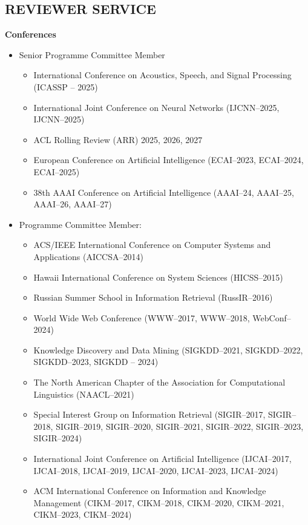 \documentclass[margin]{res}
\begin{document}
\begin{resume}
\section{REVIEWER SERVICE}
\textbf{Conferences}
\begin{itemize} \itemsep -10pt
    \item Senior Programme Committee Member
    \begin{itemize}
        \item International Conference on Acoustics, Speech, and Signal Processing (ICASSP -- 2025)
        \item International Joint Conference on Neural Networks (IJCNN--2025, IJCNN--2025)
        \item ACL Rolling Review (ARR) 2025, 2026, 2027
        \item European Conference on Artificial Intelligence (ECAI--2023, ECAI--2024, ECAI--2025)
        \item 38th AAAI Conference on Artificial Intelligence (AAAI--24, AAAI--25, AAAI--26, AAAI--27)
    \end{itemize}
\end{itemize}
\begin{itemize} \itemsep -10pt
\item Programme Committee Member:
\begin{itemize}
\item ACS/IEEE International Conference on Computer Systems and Applications (AICCSA--2014)
\item Hawaii International Conference on System Sciences (HICSS--2015)
\item Russian Summer School in Information Retrieval (RussIR--2016)
\item World Wide Web Conference (WWW--2017, WWW--2018, WebConf--2024)
\item Knowledge Discovery and Data Mining (SIGKDD--2021, SIGKDD--2022, SIGKDD--2023, SIGKDD -- 2024)
\item The North American Chapter of the Association for Computational Linguistics (NAACL--2021)
\item Special Interest Group on Information Retrieval (SIGIR--2017, SIGIR--2018, SIGIR--2019, SIGIR--2020, SIGIR--2021, SIGIR--2022, SIGIR--2023, SIGIR--2024)
\item International Joint Conference on Artificial Intelligence (IJCAI--2017, IJCAI--2018, IJCAI--2019, IJCAI--2020, IJCAI--2023, IJCAI--2024)
\item ACM International Conference on Information and Knowledge Management (CIKM--2017, CIKM--2018, CIKM--2020, CIKM--2021, CIKM--2023, CIKM--2024)

\end{itemize}
\end{itemize}
\end{resume}
\end{document}
